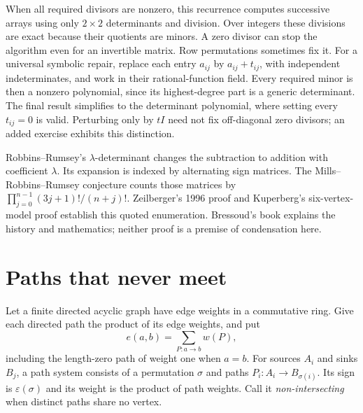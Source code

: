 When all required divisors are nonzero, this recurrence computes successive arrays using only $2\times2$ determinants and division. Over integers these divisions are exact because their quotients are minors. A zero divisor can stop the algorithm even for an invertible matrix. Row permutations sometimes fix it. For a universal symbolic repair, replace each entry $a_{ij}$ by $a_{ij}+t_{ij}$, with independent indeterminates, and work in their rational-function field. Every required minor is then a nonzero polynomial, since its highest-degree part is a generic determinant. The final result simplifies to the determinant polynomial, where setting every $t_{ij}=0$ is valid. Perturbing only by $tI$ need not fix off-diagonal zero divisors; an added exercise exhibits this distinction.

\begin{remark}
Robbins--Rumsey's $\lambda$-determinant changes the subtraction to addition with coefficient $\lambda$. Its expansion is indexed by alternating sign matrices. The Mills--Robbins--Rumsey conjecture counts those matrices by $\prod_{j=0}^{n-1}(3j+1)!/(n+j)!$. Zeilberger's 1996 proof and Kuperberg's six-vertex-model proof establish this quoted enumeration. Bressoud's book explains the history and mathematics; neither proof is a premise of condensation here.
\end{remark}

\section{Paths that never meet}\label{linear:sec:lgv}

Let a finite directed acyclic graph have edge weights in a commutative ring. Give each directed path the product of its edge weights, and put
\[e(a,b)=\sum_{P:a\to b}w(P),\]
including the length-zero path of weight one when $a=b$. For sources $A_i$ and sinks $B_j$, a path system consists of a permutation $\sigma$ and paths $P_i:A_i\to B_{\sigma(i)}$. Its sign is $\varepsilon(\sigma)$ and its weight is the product of path weights. Call it \emph{non-intersecting} when distinct paths share no vertex.

